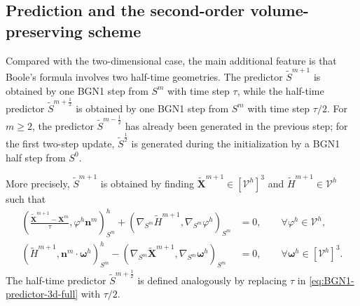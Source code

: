 \documentclass[smallextended]{svjour3}
\numberwithin{equation}{section}
\begin{document}
	\subsection{Prediction and the second-order volume-preserving scheme}
	
	 Compared with the two-dimensional case, the main additional feature is that Boole's formula involves two half-time geometries. The predictor $\widetilde{S}^{m+1}$ is obtained by one BGN1 step from $S^m$ with time step $\tau$, while the half-time predictor $\widetilde{S}^{m+\frac12}$ is obtained by one BGN1 step from $S^m$ with time step $\tau/2$. For $m\ge2$, the predictor $\widetilde{S}^{m-\frac12}$ has already been generated in the previous step; for the first two-step update, $\widetilde{S}^{\frac12}$ is generated during the initialization by a BGN1 half step from $S^0$. 
	
	More precisely, $\widetilde{S}^{m+1}$ is obtained by finding $\widetilde{\mathbf{X}}^{m+1}\in[\mathcal V^h]^3$ and $\widetilde{H}^{m+1}\in\mathcal V^h$ such that
	\begin{subequations}
		\label{eq:BGN1-predictor-3d-full}
		\begin{align}
			\left(
			\frac{\widetilde{\mathbf{X}}^{m+1}-\mathbf{X}^{m}}{\tau},
			\varphi^h\mathbf{n}^{m}
			\right)^h_{S^{m}}
			+
			\left(
			\nabla_{S^m}\widetilde{H}^{m+1},
			\nabla_{S^m}\varphi^h
			\right)_{S^m}
			&=0,
			\qquad \forall \varphi^h\in\mathcal V^h,
			\\
			\left(
			\widetilde{H}^{m+1},
			\mathbf{n}^{m}\cdot\boldsymbol{\omega}^h
			\right)^h_{S^{m}}
			-
			\left(
			\nabla_{S^m}\widetilde{\mathbf{X}}^{m+1},
			\nabla_{S^m}\boldsymbol{\omega}^h
			\right)_{S^m}
			&=0,
			\qquad \forall \boldsymbol{\omega}^h\in[\mathcal V^h]^3.
		\end{align}
	\end{subequations}
	The half-time predictor $\widetilde{S}^{m+\frac12}$ is defined analogously by replacing $\tau$ in \eqref{eq:BGN1-predictor-3d-full} with $\tau/2$.
	
\end{document}
